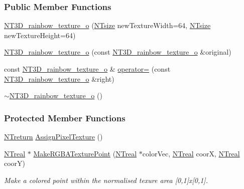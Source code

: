 \subsubsection*{Public Member Functions}
\begin{DoxyCompactItemize}
\item 
\hyperlink{class_n_t3_d__rainbow__texture__o_a25379a4ee599e1137a58cb34816bf4fc}{NT3D\_\-rainbow\_\-texture\_\-o} (\hyperlink{nt__types_8h_a06c124f2e4469769b58230253ce0560b}{NTsize} newTextureWidth=64, \hyperlink{nt__types_8h_a06c124f2e4469769b58230253ce0560b}{NTsize} newTextureHeight=64)
\item 
\hyperlink{class_n_t3_d__rainbow__texture__o_af2776d46afbad29de3b939ea64f887b2}{NT3D\_\-rainbow\_\-texture\_\-o} (const \hyperlink{class_n_t3_d__rainbow__texture__o}{NT3D\_\-rainbow\_\-texture\_\-o} \&original)
\item 
const \hyperlink{class_n_t3_d__rainbow__texture__o}{NT3D\_\-rainbow\_\-texture\_\-o} \& \hyperlink{class_n_t3_d__rainbow__texture__o_a1a82d177e8bbcd1adb66ebd461bd92bd}{operator=} (const \hyperlink{class_n_t3_d__rainbow__texture__o}{NT3D\_\-rainbow\_\-texture\_\-o} \&right)
\item 
\hyperlink{class_n_t3_d__rainbow__texture__o_a720642ad63365e40fd83e9dcfe241ef8}{$\sim$NT3D\_\-rainbow\_\-texture\_\-o} ()
\end{DoxyCompactItemize}
\subsubsection*{Protected Member Functions}
\begin{DoxyCompactItemize}
\item 
\hyperlink{nt__types_8h_ab9564ee8f091e809d21b8451c6683c53}{NTreturn} \hyperlink{class_n_t3_d__rainbow__texture__o_a6a1cae705f464f08b1043723bf801b5e}{AssignPixelTexture} ()
\item 
\hyperlink{nt__types_8h_a814a97893e9deb1eedcc7604529ba80d}{NTreal} $\ast$ \hyperlink{class_n_t3_d__rainbow__texture__o_adfe575b10983f40b4bdf8871e1b5a9d9}{MakeRGBATexturePoint} (\hyperlink{nt__types_8h_a814a97893e9deb1eedcc7604529ba80d}{NTreal} $\ast$colorVec, \hyperlink{nt__types_8h_a814a97893e9deb1eedcc7604529ba80d}{NTreal} coorX, \hyperlink{nt__types_8h_a814a97893e9deb1eedcc7604529ba80d}{NTreal} coorY)
\begin{DoxyCompactList}\small\item\em Make a colored point within the normalised texure area \mbox{[}0,1\mbox{]}x\mbox{[}0,1\mbox{]}. \item\end{DoxyCompactList}\end{DoxyCompactItemize}


